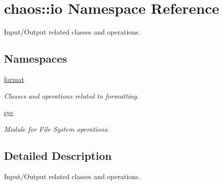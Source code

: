 \hypertarget{namespacechaos_1_1io}{}\section{chaos\+:\+:io Namespace Reference}
\label{namespacechaos_1_1io}


Input/\+Output related classes and operations.  


\subsection*{Namespaces}
\begin{DoxyCompactItemize}
\item 
 \hyperlink{namespacechaos_1_1io_1_1format}{format}
\begin{DoxyCompactList}\small\item\em Classes and operations related to formatting. \end{DoxyCompactList}\item 
 \hyperlink{namespacechaos_1_1io_1_1sys}{sys}
\begin{DoxyCompactList}\small\item\em Module for File System operations. \end{DoxyCompactList}\end{DoxyCompactItemize}


\subsection{Detailed Description}
Input/\+Output related classes and operations. 